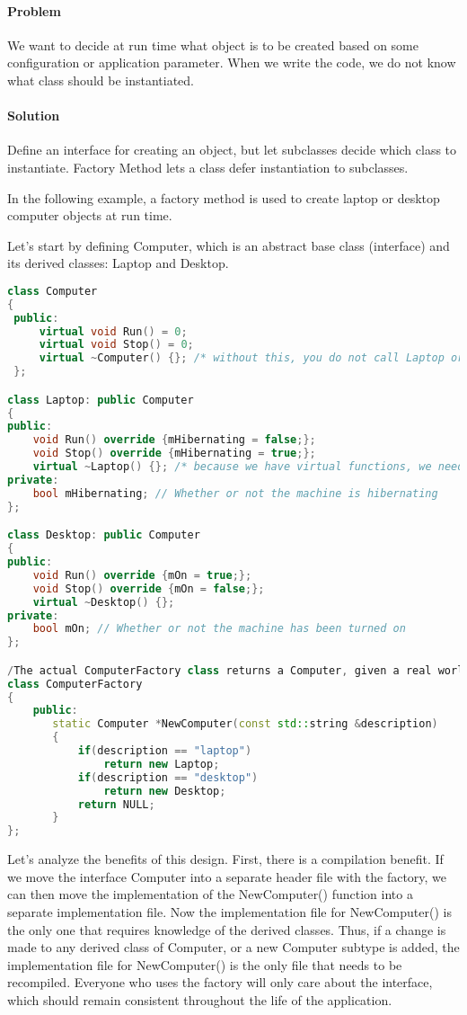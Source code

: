 \documentclass{book}
\begin{document}
\paragraph{Problem}
    We want to decide at run time what object is to be created based on some configuration or application parameter. When we write the code, we do not know what class should be instantiated.

\paragraph{Solution} 
    Define an interface for creating an object, but let subclasses decide which class to instantiate. Factory Method lets a class defer instantiation to subclasses.

In the following example, a factory method is used to create laptop or desktop computer objects at run time.

Let's start by defining Computer, which is an abstract base class (interface) and its derived classes: Laptop and Desktop.
\begin{lstlisting}[caption={Abstract Factory Pattern sample 1}, language=C++]
class Computer
{
 public:
     virtual void Run() = 0;
     virtual void Stop() = 0;
     virtual ~Computer() {}; /* without this, you do not call Laptop or Desktop destructor in this example! */
 };

class Laptop: public Computer
{
public:
    void Run() override {mHibernating = false;}; 
    void Stop() override {mHibernating = true;}; 
    virtual ~Laptop() {}; /* because we have virtual functions, we need virtual destructor */
private:
    bool mHibernating; // Whether or not the machine is hibernating
};

class Desktop: public Computer
{
public:
    void Run() override {mOn = true;}; 
    void Stop() override {mOn = false;}; 
    virtual ~Desktop() {};
private:
    bool mOn; // Whether or not the machine has been turned on
};

/The actual ComputerFactory class returns a Computer, given a real world description of the object.
class ComputerFactory
{
    public:
       static Computer *NewComputer(const std::string &description)
       {
           if(description == "laptop")
               return new Laptop;
           if(description == "desktop")
               return new Desktop;
           return NULL;
       }
};
\end{lstlisting}
Let's analyze the benefits of this design. First, there is a compilation benefit.
If we move the interface Computer into a separate header file with the factory, we can then move the implementation of the NewComputer() function into a separate implementation file.
Now the implementation file for NewComputer() is the only one that requires knowledge of the derived classes.
Thus, if a change is made to any derived class of Computer, or a new Computer subtype is added, the implementation file for NewComputer() is the only file that needs to be recompiled.
Everyone who uses the factory will only care about the interface, which should remain consistent throughout the life of the application.
\end{document}
